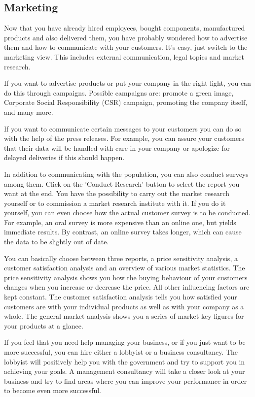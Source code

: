 \subsection{Marketing} \label{marketing_manual}


Now that you have already hired employees, bought components, manufactured products and also delivered them, you have probably wondered how to advertise them and how to communicate with your customers. It's easy, just switch to the marketing view. This includes external communication, legal topics and market research.

If you want to advertise products or put your company in the right light, you can do this through campaigns. Possible campaigns are: promote a green image, Corporate Social Responsibility (\gls{CSR}) campaign, promoting the company itself, and many more.

If you want to communicate certain messages to your customers you can do so with the help of the press releases. For example, you can assure your customers that their data will be handled with care in your company or apologize for delayed deliveries if this should happen.

In addition to communicating with the population, you can also conduct surveys among them. Click on the 'Conduct Research' button to select the report you want at the end. You have the possibility to carry out the market research yourself or to commission a market research institute with it. If you do it yourself, you can even choose how the actual customer survey is to be conducted. For example, an oral survey is more expensive than an online one, but yields immediate results.  By contrast, an online survey takes longer, which can cause the data to be slightly out of date.

You can basically choose between three reports, a price sensitivity analysis, a customer satisfaction analysis and an overview of various market statistics. The price sensitivity analysis shows you how the buying behaviour of your customers changes when you increase or decrease the price. All other influencing factors are kept constant. The customer satisfaction analysis tells you how satisfied your customers are with your individual products as well as with your company as a whole. The general market analysis shows you a series of market key figures for your products at a glance. 

If you feel that you need help managing your business, or if you just want to be more successful, you can hire either a lobbyist or a business consultancy. The lobbyist will positively help you with the government and try to support you in achieving your goals. 
A management consultancy will take a closer look at your business and try to find areas where you can improve your performance in order to become even more successful.